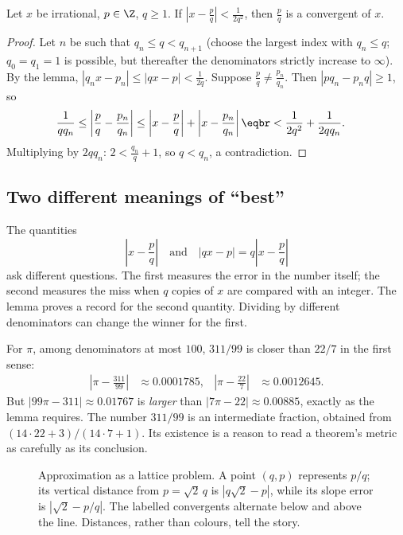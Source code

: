\begin{theorem}[Legendre]\label{thm:legendre}
Let $x$ be irrational, $p\in\Z$, $q\ge1$. If $\left|x-\frac pq\right|<\frac1{2q^2}$, then $\frac pq$ is a convergent of $x$.
\end{theorem}
\begin{proof}
Let $n$ be such that $q_n\le q<q_{n+1}$ (choose the largest index with $q_n\le q$; $q_0=q_1=1$ is possible, but thereafter the denominators strictly increase to $\infty$). By the lemma, $|q_nx-p_n|\le|qx-p|<\frac1{2q}$. Suppose $\frac pq\ne\frac{p_n}{q_n}$. Then $|pq_n-p_nq|\ge1$, so
\[
\begin{aligned}\frac1{qq_n}\le\left|\frac pq-\frac{p_n}{q_n}\right|&\le\left|x-\frac pq\right|+\left|x-\frac{p_n}{q_n}\right|\eqbr<\frac1{2q^2}+\frac1{2qq_n}.\end{aligned}
\]
Multiplying by $2qq_n$: $2<\frac{q_n}q+1$, so $q<q_n$, a contradiction.
\end{proof}

\subsection*{Two different meanings of “best”}
The quantities
\[
\left|x-\frac pq\right|\quad\text{and}\quad|qx-p|=q\left|x-\frac pq\right|
\]
ask different questions. The first measures the error in the number itself; the second measures the miss when $q$ copies of $x$ are compared with an integer. The lemma proves a record for the second quantity. Dividing by different denominators can change the winner for the first.

For $\pi$, among denominators at most $100$, $311/99$ is closer than $22/7$ in the first sense:
\[
\begin{aligned}
\left|\pi-\frac{311}{99}\right|&\approx0.0001785,
&\left|\pi-\frac{22}7\right|&\approx0.0012645.
\end{aligned}
\]
But $|99\pi-311|\approx0.01767$ is \emph{larger} than $|7\pi-22|\approx0.00885$, exactly as the lemma requires. The number $311/99$ is an intermediate fraction, obtained from $(14\cdot22+3)/(14\cdot7+1)$. Its existence is a reason to read a theorem's metric as carefully as its conclusion.

\begin{figure}[ht]
\centering
{}
\caption{Approximation as a lattice problem. A point $(q,p)$ represents $p/q$; its vertical distance from $p=\sqrt2\,q$ is $|q\sqrt2-p|$, while its slope error is $|\sqrt2-p/q|$. The labelled convergents alternate below and above the line. Distances, rather than colours, tell the story.}
\label{fig:cflattice}
\end{figure}

